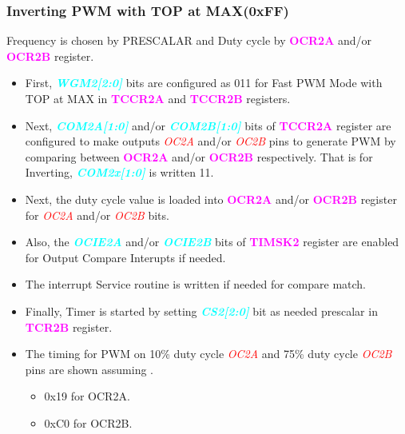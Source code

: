 \documentclass{article}
\newcommand{\bitFormat}[1]{\emph{\textbf{\textcolor{cyan}{#1}}}}
\newcommand{\regFormat}[1]{\textbf{\textcolor{magenta}{#1}}}
\newcommand{\pinFormat}[1]{\emph{\textcolor{red}{#1}}}
\begin{document}
\subsubsection{Inverting PWM with TOP at MAX(0xFF)}
\quad Frequency is chosen by PRESCALAR and Duty cycle by \regFormat{OCR2A} and/or \regFormat{OCR2B} register.
\begin{itemize}
    \item First, \bitFormat{WGM2[2:0]} bits are configured as 011 for Fast PWM Mode with TOP at MAX in \regFormat{TCCR2A} and \regFormat{TCCR2B} registers.
    \item Next, \bitFormat{COM2A[1:0]} and/or \bitFormat{COM2B[1:0]} bits of \regFormat{TCCR2A} register are configured to make outputs \pinFormat{OC2A} and/or \pinFormat{OC2B} pins to generate PWM by comparing between \regFormat{OCR2A} and/or \regFormat{OCR2B} respectively. That is for Inverting, \bitFormat{COM2x[1:0]} is written 11.
    \item Next, the duty cycle value is loaded into \regFormat{OCR2A} and/or \regFormat{OCR2B} register for \pinFormat{OC2A} and/or \pinFormat{OC2B} bits.
    \item Also, the \bitFormat{OCIE2A} and/or \bitFormat{OCIE2B} bits of \regFormat{TIMSK2} register  are enabled for Output Compare Interupts if needed.
    \item The interrupt Service routine is written if needed for compare match.
    \item Finally, Timer is started by setting \bitFormat{CS2[2:0]} bit as needed prescalar in \regFormat{TCR2B} register.
    \item The timing for PWM on 10\% duty cycle \pinFormat{OC2A} and 75\% duty cycle \pinFormat{OC2B} pins are shown assuming .
    \begin{itemize}
        \item 0x19 for OCR2A.
        \item 0xC0 for OCR2B.
    \end{itemize}
\end{itemize}
\end{document}
